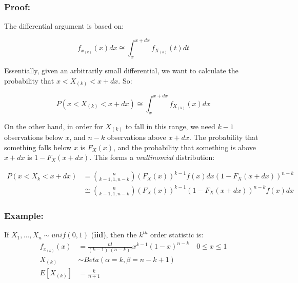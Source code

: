 \documentclass{article}
\begin{document}
\subsubsection*{Proof:}

The differential argument is based on:

\begin{equation*}
    f_{x_{(k)}} (x) dx \cong \int_{x}^{x+dx} f_{X_{(k)}}(t) dt
\end{equation*}

Essentially, given an arbitrarily small differential, we want to calculate the probability that $x < X_{(k)} < x+dx$. So:

\begin{equation*}
        P\left(x < X_{(k)} < x + dx \right) \cong \int_{x}^{x+dx} f_{X_{(k)}} (x) dx
\end{equation*}

\noindent On the other hand, in order for $X_{(k)}$ to fall in this range, we need $k-1$ observations below $x$, and $n-k$ observations above $x+dx$. The probability that something falls below $x$ is $F_X(x)$, and the probability that something is above $x+dx$ is $1 - F_X(x + dx)$. This forms a \textit{multinomial} distribution:

\begin{equation*}
\begin{split}
    P(x < X_k < x + dx) &= \binom{n}{k-1,1,n-k} \left (F_X(x) \right)^{k-1} f(x) dx \left(1 - F_X(x + dx)\right)^{n-k}\\
    &\cong \binom{n}{k-1,1,n-k} \left (F_X(x) \right)^{k-1} \left(1 - F_X(x + dx)\right)^{n-k} f(x) dx
\end{split}
\end{equation*}

\subsubsection*{Example:}

If $X_1,...,X_n \sim unif(0,1)$ (\textbf{iid}), then the $k^{th}$ order statistic is:
\begin{equation*}
    \begin{split}
        f_{x_{(k)}} (x) &= \frac{n!}{(k-1)!(n-k)!} x^{k-1} (1-x)^{n-k} \quad 0 \leq x \leq 1\\
        X_{(k)} &\sim Beta(\alpha = k, \beta = n-k+1)\\
        E\left[X_{(k)} \right] &= \frac{k}{n+1}
    \end{split}
\end{equation*}
\end{document}
